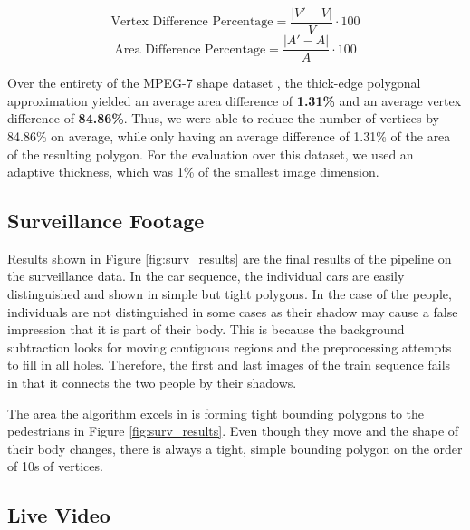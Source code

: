 \documentclass[10pt,twocolumn,letterpaper]{article}
\begin{document}
\begin{equation}
	\text{Vertex Difference Percentage} = \frac{|V' - V|}{V} \cdot 100
    \label{eq:vertex_difference}
\end{equation}
\begin{equation}
	\text{Area Difference Percentage} = \frac{|A' - A|}{A} \cdot 100
    \label{eq:area_difference}
\end{equation}

Over the entirety of the MPEG-7 shape dataset \cite{MPEG-7}, the thick-edge polygonal approximation yielded an average
area difference of \textbf{1.31\%} and an average vertex difference of \textbf{84.86\%}. Thus, we were able to reduce
the number of vertices by 84.86\% on average, while only having an average difference of 1.31\% of the area of the
resulting polygon. For the evaluation over this dataset, we used an adaptive thickness, which was 1\% of the smallest
image dimension.

\subsection{Surveillance Footage}

Results shown in Figure \ref{fig:surv_results} are the final results of the pipeline on the surveillance data. In the
car sequence, the individual cars are easily distinguished and shown in simple but tight polygons. In the case of the
people, individuals are not distinguished in some cases as their shadow may cause a false impression that it is part of
their body. This is because the background subtraction looks for moving contiguous regions and the preprocessing
attempts to fill in all holes. Therefore, the first and last images of the train sequence fails in that it connects the
two people by their shadows.

The area the algorithm excels in is forming tight bounding polygons to the pedestrians in Figure \ref{fig:surv_results}.
Even though they move and the shape of their body changes, there is always a tight, simple bounding polygon on the order
of 10s of vertices.

\subsection{Live Video}
\end{document}
